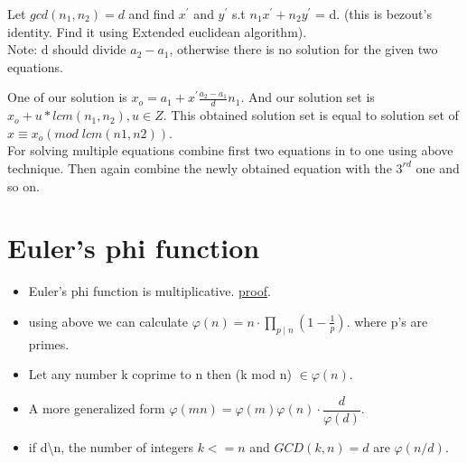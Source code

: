 \documentclass[../Notes.tex]{subfiles}
\begin{document}
Let $gcd(n_1,n_2)=d$ and find $x^\prime$ and $y^\prime$ s.t $n_1x^\prime + n_2y^\prime$ = d. (this is bezout's identity. Find it using Extended euclidean algorithm).\\
Note: d should divide $a_2-a_1$, otherwise there is no solution for the given two equations.

One of our solution is $x_o=a_1+x^\prime \frac{a_2-a_1}{d}n_1$. And our solution set is \\ $x_o+u*lcm(n_1,n_2), u\in Z$. This obtained solution set is equal to solution set of $x\equiv x_o(mod\;lcm(n1,n2))$.\\

For solving multiple equations combine first two equations in to one using above technique. Then again combine the newly obtained equation with the $3^{rd}$ one and so on.

\section{Euler's phi function}
\begin{itemize}
	\item Euler's phi function is multiplicative. \href{https://proofwiki.org/w/index.php?title=Euler_Phi_Function_is_Multiplicative&oldid=373969}{proof}.
	\item using above we can calculate $\varphi(n) = n\cdot \prod_{p\mid n}\left(1 - \frac1p\right).$ where p's are primes.
	\item Let any number k coprime to n then (k mod n) $\in \varphi(n)$.
	\item A more generalized form $\varphi (mn) = \varphi (m) \varphi (n) \cdot \dfrac{d}{\varphi (d)}$.
	\item if d\textbackslash n, the number of integers $k<=n$ and $GCD(k,n)=d$ are $\varphi(n/d)$.
\end{itemize}
\end{document}
